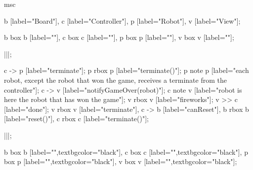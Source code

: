 \begin{msc}
msc
{

b [label="Board"],
c [label="Controller"],
p [label="Robot"],
v [label="View"];

b box b [label=""],
c box c [label=""],
p box p [label=""],
v box v [label=""];

|||;

c -> p [label="terminate"];
p rbox p [label="terminate()"];
p note p [label="each robot, except the robot that won the game, receives a terminate from the controller"];
c -> v [label="notifyGameOver(robot)"];
c note v [label="robot is here the robot that has won the game"];
v rbox v [label="fireworks"];
v >> c [label="done"];
v rbox v [label="terminate"],
c -> b [label="canReset"],
b rbox b [label="reset()"],
c rbox c [label="terminate()"];


|||;

b box b [label="",textbgcolor="black"],
c box c [label="",textbgcolor="black"],
p box p [label="",textbgcolor="black"],
v box v [label="",textbgcolor="black"];

}
\end{msc}
